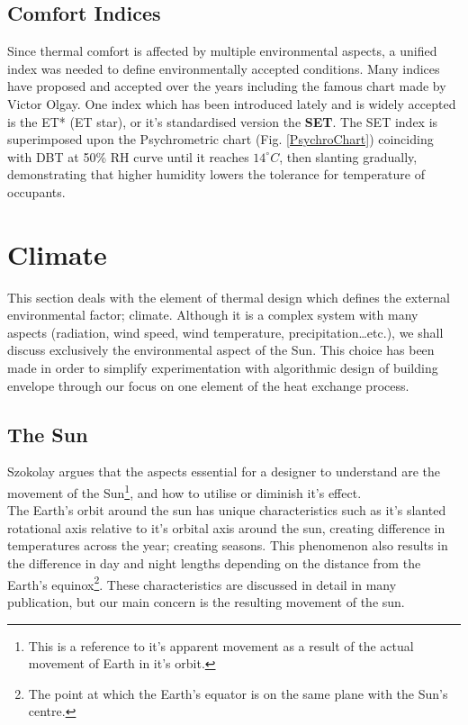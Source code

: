\subsection{Comfort Indices}
Since thermal comfort is affected by multiple environmental aspects, a unified index was needed to
define environmentally accepted conditions. Many indices have proposed and accepted over the years
including the famous chart made by Victor Olgay. One index which has been introduced lately and is
widely accepted is the ET* (ET star), or it's standardised version the \textbf{SET}. The SET index
is superimposed upon the Psychrometric chart (Fig. \ref{PsychroChart}) coinciding with DBT at 50\%
RH curve until it reaches $14^\circ C$, then slanting gradually, demonstrating that higher humidity
lowers the tolerance for temperature of occupants.

\section{Climate}
This section deals with the element of thermal design which defines the external environmental
factor; climate. Although it is a complex system with many aspects (radiation, wind speed, wind
temperature, precipitation\ldots etc.), we shall discuss exclusively the environmental aspect of the
Sun. This choice has been made in order to simplify experimentation with
algorithmic design of building envelope through our focus on one element of the heat exchange process.

\subsection{The Sun}
Szokolay \cite{szokolay08} argues that the aspects essential for a designer to understand are the
movement of the Sun\footnote{This is a reference to it's apparent movement as a result of the actual
movement of Earth in it's orbit.}, and how to utilise or diminish it's effect.\\
The Earth's orbit around the sun has unique characteristics such as it's slanted rotational axis
relative to it's orbital axis around the sun, creating difference in temperatures across the year;
creating seasons. This phenomenon also results in the difference in day and night lengths depending
on the distance from the Earth's equinox\footnote{The point at which the Earth's equator is on the
same plane with the Sun's centre.}. These characteristics are discussed in detail in many
publication, but our main concern is the resulting movement of the sun.

